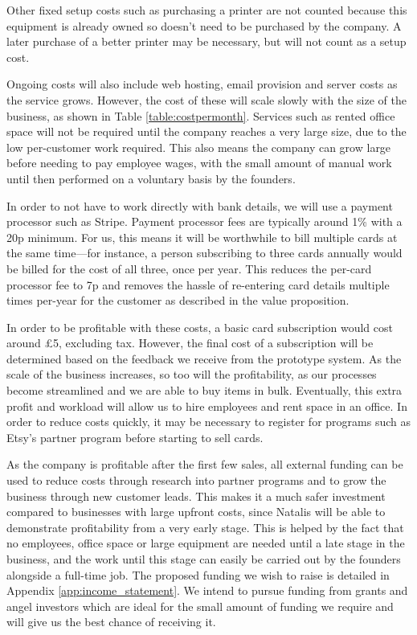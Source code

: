 \documentclass[10pt,a4paper]{article}
\begin{document}
Other fixed setup costs such as purchasing a printer are not counted because this equipment is already owned so doesn't need to be purchased by the company. A later purchase of a better printer may be necessary, but will not count as a setup cost.

Ongoing costs will also include web hosting, email provision and server costs as the service grows. However, the cost of these will scale slowly with the size of the business, as shown in Table \ref{table:costpermonth}. Services such as rented office space will not be required until the company reaches a very large size, due to the low per-customer work required. This also means the company can grow large before needing to pay employee wages, with the small amount of manual work until then performed on a voluntary basis by the founders.

In order to not have to work directly with bank details, we will use a payment processor such as Stripe. Payment processor fees are typically around 1\% with a 20p minimum. For us, this means it will be worthwhile to bill multiple cards at the same time---for instance, a person subscribing to three cards annually would be billed for the cost of all three, once per year. This reduces the per-card processor fee to 7p and removes the hassle of re-entering card details multiple times per-year for the customer as described in the value proposition.

In order to be profitable with these costs, a basic card subscription would cost around £5, excluding tax. However, the final cost of a subscription will be determined based on the feedback we receive from the prototype system. As the scale of the business increases, so too will the profitability, as our processes become streamlined and we are able to buy items in bulk. Eventually, this extra profit and workload will allow us to hire employees and rent space in an office. In order to reduce costs quickly, it may be necessary to register for programs such as Etsy's partner program before starting to sell cards.

As the company is profitable after the first few sales, all external funding can be used to reduce costs through research into partner programs and to grow the business through new customer leads. This makes it a much safer investment compared to businesses with large upfront costs, since Natalis will be able to demonstrate profitability from a very early stage. This is helped by the fact that no employees, office space or large equipment are needed until a late stage in the business, and the work until this stage can easily be carried out by the founders alongside a full-time job. The proposed funding we wish to raise is detailed in Appendix \ref{app:income_statement}. We intend to pursue funding from grants and angel investors which are ideal for the small amount of funding we require and will give us the best chance of receiving it. 
\end{document}
